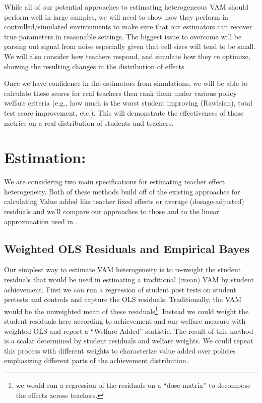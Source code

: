 \documentclass[letterpaper,12pt]{article}
\begin{document}
While all of our potential approaches to estimating heterogeneous VAM should perform well in large samples, we will need to show how they perform in controlled/simulated environments to make sure that our estimators can recover true parameters in reasonable settings. The biggest issue to overcome will be parsing out signal from noise especially given that cell sizes will tend to be small. We will also consider how teachers respond, and simulate how they re optimize, showing the resulting changes in the distribution of effects.

Once we have confidence in the estimators from simulations, we will be able to calculate these scores for real teachers then rank them under various policy welfare criteria (e.g., how much is the worst student improving (Rawlsian), total test score improvement, etc.). This will demonstrate the effectiveness of these metrics on a real distribution of students and teachers. 




\section{Estimation:}
We are considering two main specifications for estimating teacher effect heterogeneity. Both of these methods build off of the existing approaches for calculating Value added like teacher fixed effects or average (dosage-adjusted) residuals and we'll compare our approaches to those and to the linear approximation used in \citet{lockwood2007sensitivity}.


\subsection{Weighted OLS Residuals and Empirical Bayes}
Our simplest way to estimate VAM heterogeneity is to re-weight the student residuals that would be used in estimating a traditional (mean) VAM by student achievement. First we can run a regression of student post tests on student pretests and controls and capture the OLS residuals. Traditionally, the VAM would be the unweighted mean of these residuals\footnote{we would run a regression of the residuals on a ``dose matrix'' to decompose the effects across teachers.}. Instead  we could weight the student residuals here according to achievement and our welfare measure with weighted OLS and report a ``Welfare Added'' statistic. The result of this method is a scalar determined by student residuals and welfare weights. We could repeat this process with different weights to characterize value added over policies emphasizing different parts of the achievement distribution.
\end{document}

